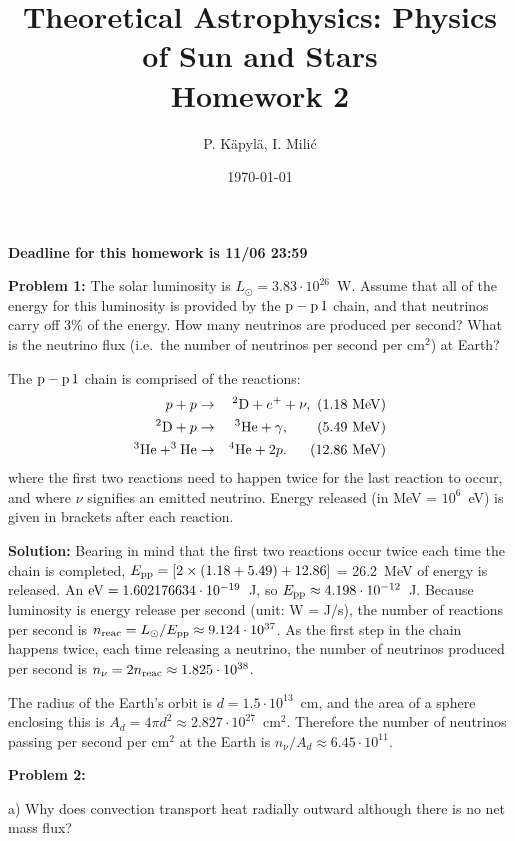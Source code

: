 \documentclass[12pt]{article}
\title{Theoretical Astrophysics: Physics of Sun and Stars\\
Homework 2}
\author{P. K\"{a}pyl\"{a}, I. Mili\'{c}}
\date{\today}
\begin{document}
\maketitle

\textbf{Deadline for this homework is \textbf{11}/06 23:59}

{\bf Problem 1:} The solar luminosity is $L_\odot = 3.83\cdot
10^{26}$~W. Assume that all of the energy for this luminosity is
provided by the ${\rm p-p\,1}$ chain, and that neutrinos carry off 3\% of the
energy. How many neutrinos are produced per second? What is the
neutrino flux (i.e.\ the number of neutrinos per second per cm$^2$) at
Earth?

The ${\rm p-p\,1}$ chain is comprised of the reactions:
\begin{eqnarray}
  p + p &\rightarrow& ^2{\rm D} + e^+ + \nu,\ (1.18~{\rm MeV})\nonumber \\
  ^2{\rm D} + p &\rightarrow& ^3{\rm He} + \gamma,\ \ \ \ \ \ (5.49~{\rm MeV}) \nonumber \\
  ^3{\rm He} + ^3{\rm He} &\rightarrow& ^4{\rm He} + 2p.\ \ \ \ \ (12.86~{\rm MeV})
\end{eqnarray}
where the first two reactions need to happen twice for the last
reaction to occur, and where $\nu$ signifies an emitted
neutrino. Energy released (in MeV = $10^6$~eV) is given in brackets
after each reaction.


{\bf Solution:} Bearing in mind that the first two reactions occur
twice each time the chain is completed, $E_{\rm pp} = [2 \times (1.18
  + 5.49) + 12.86]$ = 26.2~MeV of energy is released. An ${\rm eV} =
1.602176634 \cdot 10^{-19}$~J, so $E_{\rm pp} \approx 4.198 \cdot
10^{-12}$~J. Because luminosity is energy release per second (unit: W
= J/s), the number of reactions per second is $n_{\rm reac} =
L_\odot / E_{\rm pp} \approx 9.124 \cdot 10^{37}$. As the first step in
the chain happens twice, each time releasing a neutrino, the number of
neutrinos produced per second is $n_\nu = 2 n_{\rm reac} \approx 1.825
\cdot 10^{38}$.

The radius of the Earth's orbit is $d = 1.5 \cdot 10^{13}$~cm, and the
area of a sphere enclosing this is $A_d = 4\pi d^2 \approx 2.827 \cdot
10^{27}$~cm$^2$. Therefore the number of neutrinos passing per second
per cm$^2$ at the Earth is $n_\nu/A_d \approx 6.45 \cdot 10^{11}$.


{\bf Problem 2:} 

a) Why does convection transport heat radially outward although there
is no net mass flux?
\end{document}
